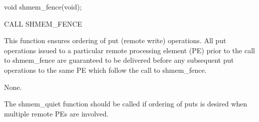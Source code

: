 
\synC   %
 
 void shmem_fence(void);

\synF   %

 CALL SHMEM_FENCE

{
    This  function ensures ordering of put (remote write) operations. All
    put operations issued to a particular remote  processing element (PE)
    prior  to the call to shmem\_fence are guaranteed to be delivered before
    any subsequent put operations to the same PE which follow the  call  to
    shmem\_fence.
}

{

      {None.}
}


{
    The  shmem\_quiet	 function  should  be  called  if  ordering of puts is
    desired when multiple remote PEs are involved.
}

\eAPI

